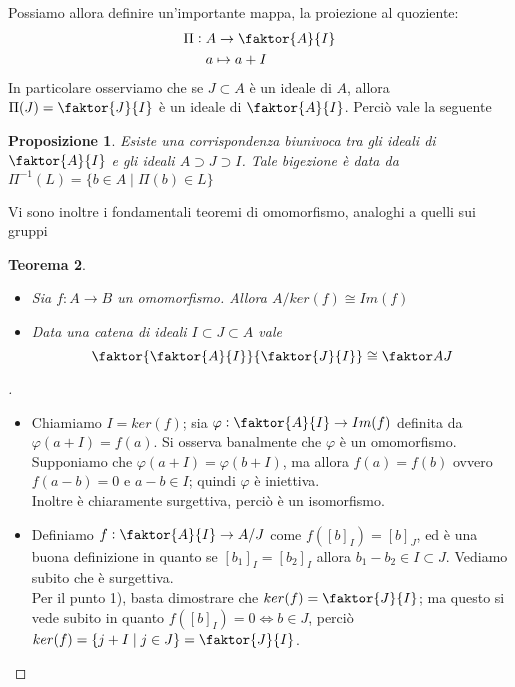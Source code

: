 \documentclass[a4paper,10pt]{article}
\theoremstyle{plain}
\newtheorem{thm}{Teorema}[section]
\newtheorem{prop}[thm]{Proposizione}
\theoremstyle{definition}
\newenvironment{myproof}[1][\proofname]{%
  \begin{proof}[#1]$ $\par\nobreak\ignorespaces
}{%
  \qedhere
  \end{proof}
}
\begin{document}
Possiamo allora definire un'importante mappa, la proiezione al quoziente:
\begin{align*}
    \Pi:\;&A\to \faktor{A}{I} \\ &a\mapsto a+I
\end{align*}
In particolare osserviamo che se $J\subset A$ è un ideale di $A$, allora $\Pi(J)=\faktor{J}{I}$ è un ideale di $\faktor{A}{I}$. Perciò vale la seguente
\begin{prop}
    Esiste una corrispondenza biunivoca tra gli ideali di $\faktor{A}{I}$ e gli ideali $A\supset J\supset I$. Tale bigezione è data da $\Pi^{-1}(L)=\{b\in A\mid \Pi(b)\in L\}$
\end{prop}
Vi sono inoltre i fondamentali teoremi di omomorfismo, analoghi a quelli sui gruppi
\begin{thm}
    $ $
    \begin{itemize}
        \item[1)] Sia $f:A\to B$ un omomorfismo. Allora $A/ker(f)\cong Im(f)$
        \item[2)] Data una catena di ideali $I\subset J\subset A$ vale $$ \faktor{\faktor{A}{I}}{\faktor{J}{I}}\cong \faktor A J$$
    \end{itemize}
\end{thm}
\begin{myproof}
    \begin{itemize}
        \item[1)] Chiamiamo $I=ker(f)$; sia $\varphi: \faktor{A}{I}\to Im(f)$ definita da $\varphi(a+I)=f(a)$. Si osserva banalmente che $\varphi$ è un omomorfismo.\\
        Supponiamo che $\varphi(a+I)=\varphi(b+I)$, ma allora $f(a)=f(b)$ ovvero $f(a-b)=0$ e $a-b\in I$; quindi $\varphi$ è iniettiva.\\
        Inoltre è chiaramente surgettiva, perciò è un isomorfismo.
        \item[2)] Definiamo $f: \faktor{A}{I}\to A/J$ come $f([b]_I)=[b]_J$, ed è una buona definizione in quanto se $[b_1]_I=[b_2]_I$ allora $b_1-b_2\in I\subset J$. Vediamo subito che è surgettiva.\\
        Per il punto 1), basta dimostrare che $ker(f)=\faktor{J}{I}$; ma questo si vede subito in quanto $f([b]_I)=0\iff b\in J$, perciò $ker(f)= \{ j+I\mid j\in J\}=\faktor{J}{I}$.

    \end{itemize}
\end{myproof}
\end{document}
